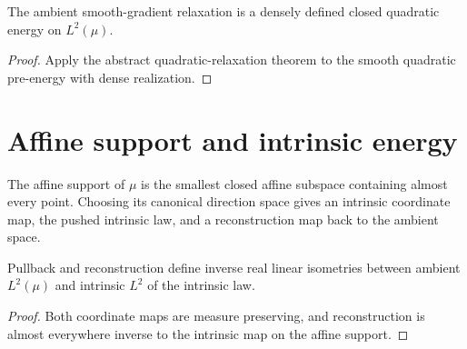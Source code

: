 \begin{theorem}
  \label{thm:smooth-gradient-relaxation-closed}
  \leanok
  The ambient smooth-gradient relaxation is a densely defined closed quadratic energy on
  $L^2(\mu)$.
\end{theorem}
\begin{proof}
  \leanok
  Apply the abstract quadratic-relaxation theorem to the smooth quadratic pre-energy with dense
  realization.
\end{proof}

\section{Affine support and intrinsic energy}

\begin{definition}
  \label{def:affine-support-intrinsic-law}
  \leanok
  The affine support of $\mu$ is the smallest closed affine subspace containing almost every
  point.  Choosing its canonical direction space gives an intrinsic coordinate map, the pushed
  intrinsic law, and a reconstruction map back to the ambient space.
\end{definition}

\begin{theorem}
  \label{thm:intrinsic-l2-equivalence}
  \leanok
  Pullback and reconstruction define inverse real linear isometries between ambient
  $L^2(\mu)$ and intrinsic $L^2$ of the intrinsic law.
\end{theorem}
\begin{proof}
  \leanok
  Both coordinate maps are measure preserving, and reconstruction is almost everywhere inverse
  to the intrinsic map on the affine support.
\end{proof}

